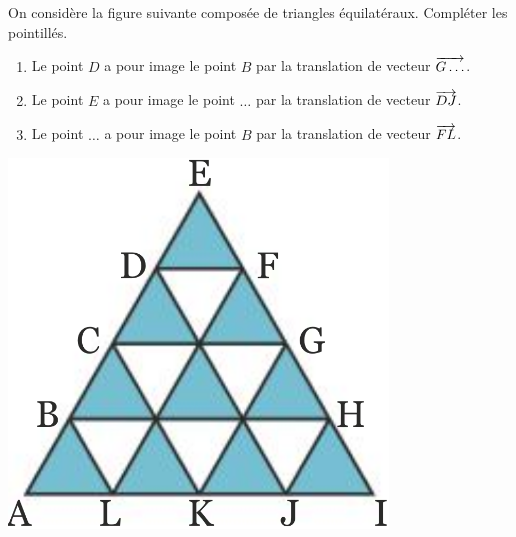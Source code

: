 \documentclass[11pt]{article}
\begin{document}
\begin{app}
  \begin{minipage}[]{.7\textwidth}
    On considère la figure suivante composée de triangles équilatéraux.
    Compléter les pointillés.
    \begin{enumerate}
      \item Le point $D$ a pour image le point $B$ par la translation de vecteur
        $\overrightarrow{G\ldots}$.
      \item Le point $E$ a pour image le point $\ldots$ par la translation de
        vecteur $\overrightarrow{DJ}$.
      \item Le point $\ldots$ a pour image le point $B$ par la translation de
        vecteur $\overrightarrow{FL}$.
    \end{enumerate}
  \end{minipage}
  \begin{minipage}[]{.3\textwidth}
    \begin{center}
      \includegraphics[scale=.3]{triangles.png}
    \end{center}
  \end{minipage}
\end{app}
\end{document}
